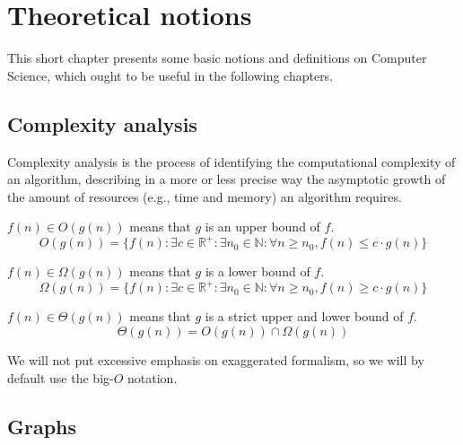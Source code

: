 \chapter{Theoretical notions} \label{theoretical-notions}
This short chapter presents some basic notions and definitions on Computer Science, which ought to be useful in the following chapters.
\section{Complexity analysis} \label{complexity-analysis}
Complexity analysis is the process of identifying the computational complexity of an algorithm, describing in a more or less precise way the asymptotic growth of the amount of resources (e.g., time and memory) an algorithm requires.
\begin{definition} $f(n) \in O(g(n))$ means that $g$ is an upper bound of $f$.
    \begin{equation*}
        O(g(n))=\{f(n) : \exists c \in \mathbb{R}^+ \colon \exists n_0 \in \mathbb{N} \colon \forall n \geq n_0, f(n) \leq c\cdot g(n)\}
    \end{equation*}
\end{definition}
\begin{definition} $f(n) \in \Omega(g(n))$ means that $g$ is a lower bound of $f$.
    \begin{equation*}
        \Omega(g(n))=\{f(n) : \exists c \in \mathbb{R}^+ \colon \exists n_0 \in \mathbb{N} \colon \forall n \geq n_0, f(n) \geq c\cdot g(n)\}
    \end{equation*}
\end{definition}
\begin{definition} $f(n) \in \Theta(g(n))$ means that $g$ is a strict upper and lower bound of $f$.
    \begin{equation*}
        \Theta(g(n))=O(g(n)) \cap \Omega(g(n))
    \end{equation*}
\end{definition}
We will not put excessive emphasis on exaggerated formalism, so we will by default use the big-$O$ notation.
\section{Graphs} \label{graphs}
